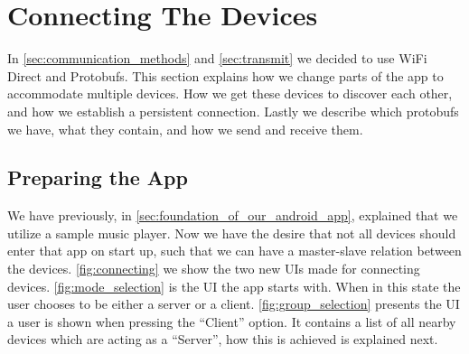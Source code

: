 \section{Connecting The Devices}
In \cref{sec:communication_methods} and \cref{sec:transmit} we decided to use WiFi Direct and Protobufs.
This section explains how we change parts of the app to accommodate multiple devices.
How we get these devices to discover each other, and how we establish a persistent connection.
Lastly we describe which protobufs we have, what they contain, and how we send and receive them.

\subsection{Preparing the App}
We have previously, in \cref{sec:foundation_of_our_android_app}, explained that we utilize a sample music player.
Now we have the desire that not all devices should enter that app on start up, such that we can have a master-slave relation between the devices.
\cref{fig:connecting} we show the two new UIs made for connecting devices.
\cref{fig:mode_selection} is the UI the app starts with.
When in this state the user chooses to be either a server or a client.
\cref{fig:group_selection} presents the UI a user is shown when pressing the ``Client'' option.
It contains a list of all nearby devices which are acting as a ``Server'', how this is achieved is explained next.

